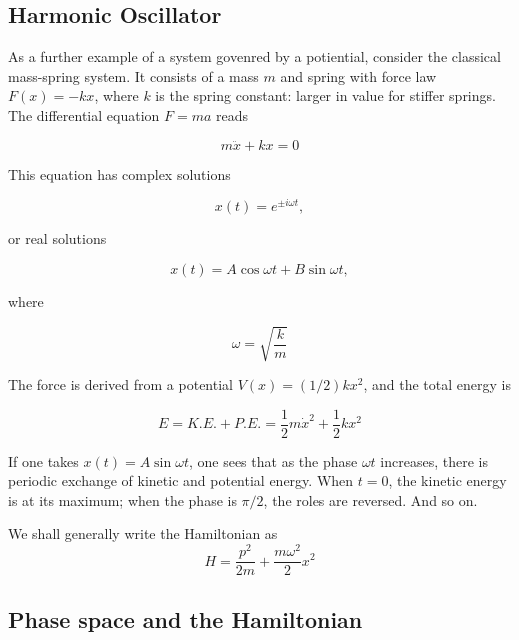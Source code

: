 \subsection{Harmonic Oscillator}

As a further example of a system govenred by a potiential, consider the classical mass-spring system.  It consists of a mass $m$ and spring with force law $F(x) = - kx$, where $k$ is the spring constant: larger in value for stiffer springs.  The differential equation $F = ma$ reads

\begin{equation}
m\ddot x + kx = 0
\end{equation}

This equation has complex solutions

\begin{equation}
  x(t) = e^{\pm i\omega t},
\end{equation}

or real solutions

\begin{equation}
  x(t) = A\cos \omega t + B \sin \omega t,
\end{equation}

where

\begin{equation}
\omega = \sqrt{\frac{k}{m}}
\end{equation}

The force is derived from a potential $V(x) = (1/2)kx^2$, and the total energy is

\begin{equation}
E = K.E. + P.E. = \frac{1}{2}m\dot x^2 + \frac{1}{2}kx^2
\end{equation}

If one takes $x(t) = A\sin \omega t$, one sees that as the phase $\omega t$ increases, there is periodic exchange of kinetic and potential energy.  When $t = 0$, the kinetic energy is at its maximum; when the phase is $\pi/2$, the roles are reversed.  And so on.


\begin{remark}
We shall generally write the Hamiltonian as
\[
H  = \frac{p^2}{2m} + \frac{m\omega^2 }{2 } x^2
\]
\end{remark}


\subsection{Phase space and the Hamiltonian}

